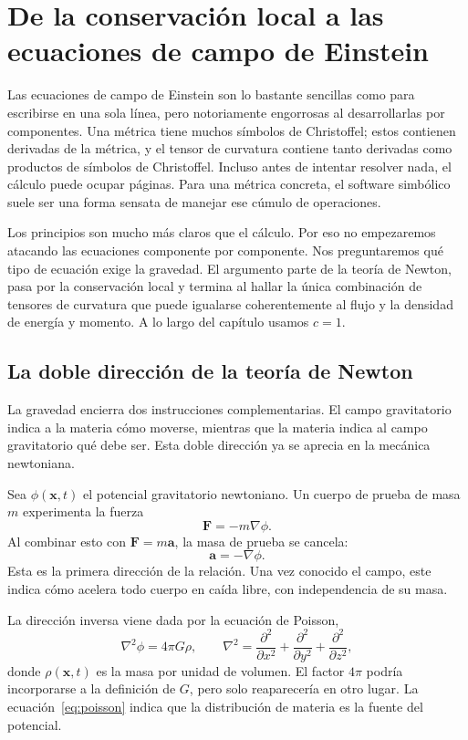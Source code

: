 \chapter{De la conservación local a las ecuaciones de campo de Einstein}

Las ecuaciones de campo de Einstein son lo bastante sencillas como para escribirse en una sola línea, pero notoriamente engorrosas al desarrollarlas por componentes. Una métrica tiene muchos símbolos de Christoffel; estos contienen derivadas de la métrica, y el tensor de curvatura contiene tanto derivadas como productos de símbolos de Christoffel. Incluso antes de intentar resolver nada, el cálculo puede ocupar páginas. Para una métrica concreta, el software simbólico suele ser una forma sensata de manejar ese cúmulo de operaciones.

Los principios son mucho más claros que el cálculo. Por eso no empezaremos atacando las ecuaciones componente por componente. Nos preguntaremos qué tipo de ecuación exige la gravedad. El argumento parte de la teoría de Newton, pasa por la conservación local y termina al hallar la única combinación de tensores de curvatura que puede igualarse coherentemente al flujo y la densidad de energía y momento. A lo largo del capítulo usamos \(c=1\).

\section{La doble dirección de la teoría de Newton}

La gravedad encierra dos instrucciones complementarias. El campo gravitatorio indica a la materia cómo moverse, mientras que la materia indica al campo gravitatorio qué debe ser. Esta doble dirección ya se aprecia en la mecánica newtoniana.

Sea \(\phi(\mathbf{x},t)\) el potencial gravitatorio newtoniano. Un cuerpo de prueba de masa \(m\) experimenta la fuerza
\begin{equation}
 \mathbf{F}=-m\nabla\phi.
\end{equation}
Al combinar esto con \(\mathbf{F}=m\mathbf{a}\), la masa de prueba se cancela:
\begin{equation}
 \mathbf{a}=-\nabla\phi.
\end{equation}
Esta es la primera dirección de la relación. Una vez conocido el campo, este indica cómo acelera todo cuerpo en caída libre, con independencia de su masa.

La dirección inversa viene dada por la ecuación de Poisson,
\begin{equation}
 \nabla^2\phi=4\pi G\rho,
 \qquad
 \nabla^2=
 \frac{\partial^2}{\partial x^2}
 +\frac{\partial^2}{\partial y^2}
 +\frac{\partial^2}{\partial z^2},
 \label{eq:poisson}
\end{equation}
donde \(\rho(\mathbf{x},t)\) es la masa por unidad de volumen. El factor \(4\pi\) podría incorporarse a la definición de \(G\), pero solo reaparecería en otro lugar. La ecuación~\eqref{eq:poisson} indica que la distribución de materia es la fuente del potencial.

